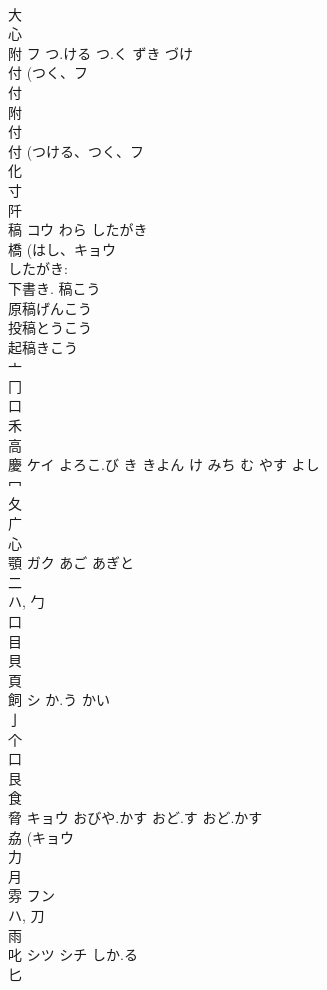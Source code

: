 \documentclass[8pt]{extreport}
\begin{document}
\begin{CJK}{UTF8}{min}
\\	大 
\\	心 
\\	附	フ	つ.ける つ.く ずき づけ	
\\	付 (つく、フ 
\\	付 
\\	附 
\\	付 
\\	付 (つける、つく、フ 
\\	化 
\\	寸 
\\	阡	
\\	稿	コウ	わら したがき	
\\	橋 (はし、キョウ 
\\	したがき: 
\\	下書き.		稿こう
\\	原稿げんこう
\\	投稿とうこう
\\	起稿きこう
\\	亠 
\\	冂 
\\	口 
\\	禾 
\\	高 
\\	慶	ケイ	よろこ.び き きよん け みち む やす よし	
\\	冖 
\\	夂 
\\	广 
\\	心 
\\	顎	ガク	あご あぎと	
\\	二 
\\	ハ, 勹 
\\	口 
\\	目 
\\	貝 
\\	頁 
\\	飼	シ	か.う かい	
\\	亅 
\\	个 
\\	口 
\\	艮 
\\	食 
\\	脅	キョウ	おびや.かす おど.す おど.かす	
\\	劦 (キョウ 
\\	力 
\\	月 
\\	雰	フン		
\\	ハ, 刀 
\\	雨 
\\	叱	シツ シチ	しか.る	
\\	匕 

\end{CJK}
\end{document}
